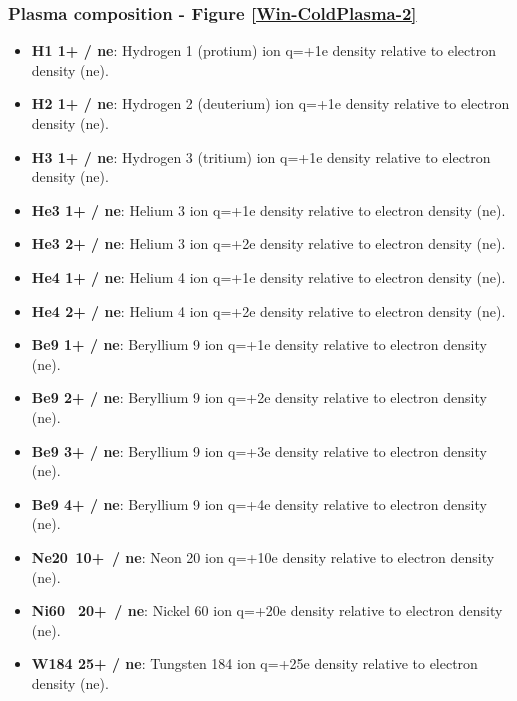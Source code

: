 \subsubsection{Plasma composition - Figure \ref{Win-ColdPlasma-2}}
\vspace{0.75em}
\begin{itemize}\itemsep0em 
	\item \textbf{H1 1+ / ne}: Hydrogen 1 (protium) ion q=+1e density relative to electron density (ne).
	\item \textbf{H2 1+ / ne}: Hydrogen 2 (deuterium) ion q=+1e density relative to electron density (ne).
	\item \textbf{H3 1+ / ne}: Hydrogen 3 (tritium) ion q=+1e density relative to electron density (ne).
	\\
	\item \textbf{He3 1+ / ne}: Helium 3 ion q=+1e density relative to electron density (ne).
    \item \textbf{He3 2+ / ne}: Helium 3 ion q=+2e density relative to electron density (ne).
    \\
    \item \textbf{He4 1+ / ne}: Helium 4 ion q=+1e density relative to electron density (ne).
    \item \textbf{He4 2+ / ne}: Helium 4 ion q=+2e density relative to electron density (ne).
    \\
	\item \textbf{Be9 1+ / ne}: Beryllium 9 ion q=+1e density relative to electron density (ne).
    \item \textbf{Be9 2+ / ne}: Beryllium 9 ion q=+2e density relative to electron density (ne).
    \item \textbf{Be9 3+ / ne}: Beryllium 9 ion q=+3e density relative to electron density (ne).
    \item \textbf{Be9 4+ / ne}: Beryllium 9 ion q=+4e density relative to electron density (ne).
    \\
	\item \textbf{Ne20 \,10+ \,/ ne}: Neon 20 ion q=+10e density relative to electron density (ne).
    \item \textbf{Ni60 \, 20+ \,/ ne}: Nickel 60 ion q=+20e density relative to electron density (ne).
    \item \textbf{W184 25+ / ne}: Tungsten 184 ion q=+25e density relative to electron density (ne).
\end{itemize}

